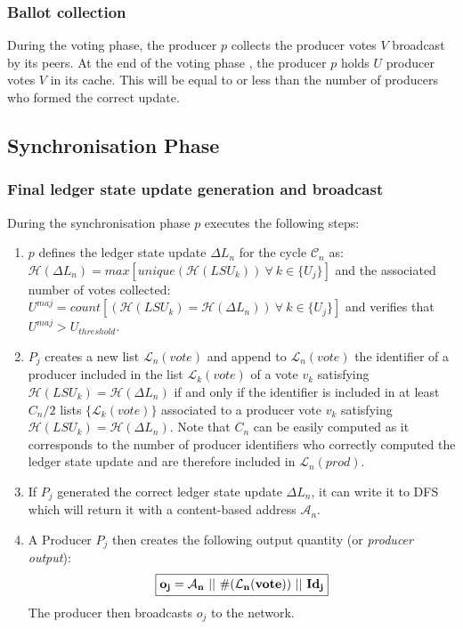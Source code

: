 \documentclass{article}
\begin{document}
\subsubsection{Ballot collection}
During the voting phase, the producer $p$ collects the producer votes $V$ broadcast by its peers. At the end of the voting phase , the producer $p$ holds $U$ producer votes $V$ in its cache. This will be equal to or less than the number of producers who formed the correct update. 

\subsection{Synchronisation Phase}

\subsubsection{Final ledger state update generation and broadcast}



During the synchronisation phase $p$ executes the following steps:

\begin{enumerate}
\item $p$ defines the ledger state update $\Delta L_n$ for the cycle $\mathcal{C}_n$ as:\\
 $\mathcal{H}(\Delta L_n) = max[unique(\mathcal{H}(LSU_k))~\forall~k\in\{U_j\}]$ and the associated number of votes collected: $U^{maj} = count[(\mathcal{H}(LSU_k) = \mathcal{H}(\Delta L_n))~\forall~k\in\{U_j\}]$ and verifies that $U^{maj}> U_{threshold}$.
\item $P_j$ creates a new list $\mathcal{L}_{n}(vote)$ and append to $\mathcal{L}_{n}(vote)$ the identifier of a producer included in the list $\mathcal{L}_{k}(vote)$ of a vote $v_k$ satisfying $\mathcal{H}(LSU_k) = \mathcal{H}(\Delta L_n)$ if and only if the identifier is included in at least $C_n/2$ lists $\{\mathcal{L}_{k}(vote)\}$ associated to a producer vote $v_{k}$ satisfying $\mathcal{H}(LSU_k) = \mathcal{H}(\Delta L_n)$. Note that $C_n$ can be easily computed as it corresponds to the number of producer identifiers who correctly computed the ledger state update and are therefore included in $\mathcal{L}_{n}(prod)$.

\item If $P_j$ generated the correct ledger state update $\Delta L_n$, it can write it to DFS which will return it with a content-based address $\mathcal{A}_n$. 
\item A Producer $P_j$ then creates the following output quantity (or \textit{producer output}):
\begin{equation} 
\fbox{$\mathbf{o_{j} = \mathcal{A}_n~||~\#(\mathcal{L}_{n}(vote))~||~Id_j}$}
\label{eq:Hj}
\end{equation}
The producer then broadcasts $o_j$ to the network.
\end{enumerate}
\end{document}
